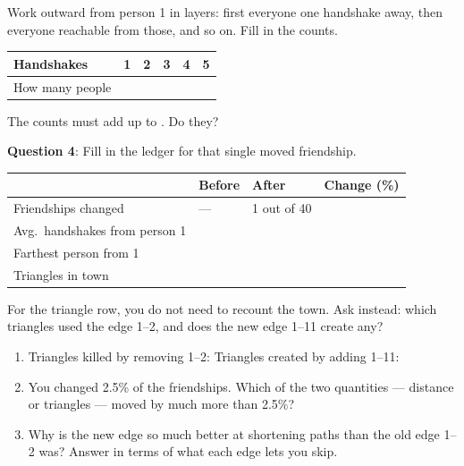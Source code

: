 \documentclass[a4paper, 14pt]{extarticle}
\begin{document}
Work outward from person 1 in layers: first everyone one handshake away, then
everyone reachable from those, and so on. Fill in the counts.

\begin{center}
\begin{tabular}{|l|p{1.6cm}|p{1.6cm}|p{1.6cm}|p{1.6cm}|p{1.6cm}|}
\hline
Handshakes & 1 & 2 & 3 & 4 & 5 \\
\hline
How many people & & & & & \\[0.5cm]
\hline
\end{tabular}
\end{center}

The counts must add up to \underline{\hspace{1.5cm}}. Do they?

\vspace{1em}

\begin{minipage}{\textwidth}
{\bf Question 4}:
Fill in the ledger for that single moved friendship.

\begin{center}
{\small
\begin{tabular}{|l|p{2.6cm}|p{2.6cm}|p{2.2cm}|}
\hline
 & Before & After & Change (\%) \\
\hline
Friendships changed & --- & 1 out of 40 & \\[0.4cm]
\hline
Avg.\ handshakes from person 1 & & & \\[0.4cm]
\hline
Farthest person from 1 & & & \\[0.4cm]
\hline
Triangles in town & & & \\[0.4cm]
\hline
\end{tabular}
}
\end{center}
\end{minipage}

For the triangle row, you do not need to recount the town. Ask instead: which
triangles used the edge 1--2, and does the new edge 1--11 create any?

\begin{enumerate}
    \item Triangles killed by removing 1--2: \underline{\hspace{1.5cm}} \quad
          Triangles created by adding 1--11: \underline{\hspace{1.5cm}}
    \item You changed 2.5\% of the friendships. Which of the two quantities ---
          distance or triangles --- moved by much more than 2.5\%?

          \underline{\hspace{\textwidth}}

    \item Why is the new edge so much better at shortening paths than the old
          edge 1--2 was? Answer in terms of what each edge lets you skip.

          \underline{\hspace{\textwidth}}
\end{enumerate}
\end{document}
